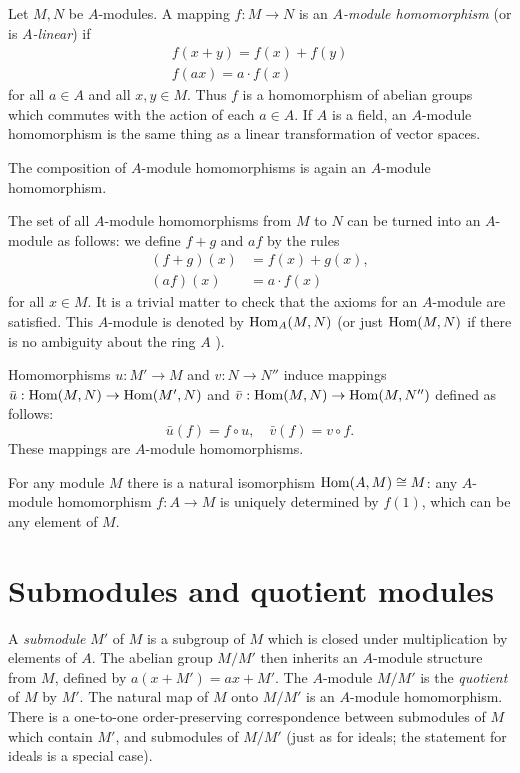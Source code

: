 \documentclass{standalone}
\theoremstyle{definition}
\theoremstyle{remark}
\begin{document}
Let $M, N$ be $A$-modules. A mapping $f: M \to N$ is an $A$\textit{-module
  homomorphism} (or is $A$\textit{-linear}) if
\begin{gather*}
  f(x+y)=f(x)+f(y) \\
  f(a x)=a \cdot f(x)
\end{gather*}
for all $a \in A$ and all $x, y \in M$. Thus $f$ is a homomorphism of abelian
groups which commutes with the action of each $a \in A$. If $A$ is a field, an
$A$-module homomorphism is the same thing as a linear transformation of vector
spaces.

The composition of $A$-module homomorphisms is again an $A$-module homomorphism.

The set of all $A$-module homomorphisms from $M$ to $N$ can be turned into an
$A$-module as follows: we define $f+g$ and $af$ by the rules
\begin{align*}
  (f+g)(x) & =f(x)+g(x), \\
  (a f)(x) & =a \cdot f(x)
\end{align*}
for all $x \in M$. It is a trivial matter to check that the axioms for an
$A$-module are satisfied. This $A$-module is denoted by $\operatorname{Hom}_{A}(M, N)$ (or
just $\operatorname{Hom}(M, N)$ if there is no ambiguity about the ring $A$ ).

Homomorphisms $u: M' \to M$ and $v: N \to N''$ induce mappings
$\bar{u}: \operatorname{Hom}(M, N) \to \operatorname{Hom}(M', N)$ and $\bar{v}: \operatorname{Hom}(M, N) \to \operatorname{Hom}(M, N'')$
defined as follows:
\[
  \bar{u}(f)=f \circ u, \quad \bar{v}(f)=v \circ f.
\]
These mappings are $A$-module homomorphisms.

For any module $M$ there is a natural isomorphism $\operatorname{Hom}(A, M) \cong M$: any
$A$-module homomorphism $f: A \to M$ is uniquely determined by $f(1)$, which can
be any element of $M$.

\section{Submodules and quotient modules}
A \textit{submodule} $M'$ of $M$ is a subgroup of $M$ which is closed under
multiplication by elements of $A$. The abelian group $M / M'$ then inherits an
$A$-module structure from $M$, defined by $a(x+M')=a x+M'$. The $A$-module
$M / M'$ is the \textit{quotient} of $M$ by $M'$. The natural map of $M$ onto
$M / M'$ is an $A$-module homomorphism. There is a one-to-one order-preserving
correspondence between submodules of $M$ which contain $M'$, and submodules of
$M/M'$ (just as for ideals; the statement for ideals is a special case).
\end{document}
